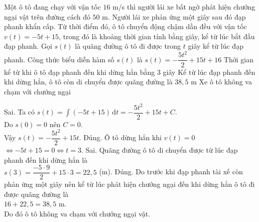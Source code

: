 \begin{ex}%
	Một ô tô đang chạy với vận tốc $16$ m/s thì người lái xe bất ngờ phát hiện chướng ngại vật trên đường cách đó $50$ m. Người lái xe phản ứng một giây sau đó đạp phanh khẩn cấp. Từ thời điểm đó, ô tô chuyển động chậm dần đều với vận tốc $v(t)=-5t+15$, trong đó là khoảng thời gian tính bằng giây, kể từ lúc bắt đầu đạp phanh. Gọi $s(t)$ là quãng đường ô tô đi được trong $t$ giây kể từ lúc đạp phanh.	
	\choiceTF
	{Công thức biểu diễn hàm số $s(t)$ là $s(t)=-\dfrac{5t^2}{2}+15t+16$}
	{\True Thời gian kể từ khi ô tô đạp phanh đến khi dừng hẳn bằng $3$ giây}
	{Kể từ lúc đạp phanh đến khi dừng hẳn, ô tô còn di chuyển được quãng đường là $38{,}5$ m}
	{\True Xe ô tô không va chạm với chướng ngại}
	\loigiai
	{
		\begin{itemchoice}
			\itemch Sai. Ta có $s(t)=\displaystyle\int \left(-5t+15\right)\mathrm{\,d}t=-\dfrac{5t^2}{2}+15t+C$.\\
			Do $s(0)=0$ nên $C=0$.\\
			Vậy $s(t)=-\dfrac{5t^2}{2}+15t$.
			\itemch Đúng. Ô tô dừng hẳn khi $v(t)=0$ $\Leftrightarrow-5t+15=0\Leftrightarrow t=3$.
			\itemch Sai. Quãng đường ô tô di chuyển được từ lúc đạp phanh đến khi dừng hẳn là\\
			$s(3)=\dfrac{-5\cdot 9}{2}+15\cdot 3=22{,}5$ (m). 
			\itemch Đúng. Do trước khi đạp phanh tài xế còn phản ứng một giây nên kể từ lúc phát hiện chướng ngại đến khi dừng hẳn ô tô đi được quãng đường là\\ $16+22{,}5=38{,}5$ m.\\
			Do đó ô tô không va chạm với chướng ngại vật.
		\end{itemchoice}
	}
\end{ex}

